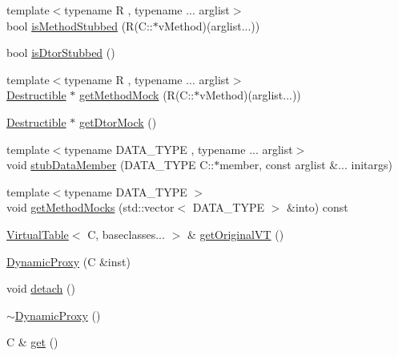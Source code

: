 \begin{DoxyCompactItemize}
\item 
{\footnotesize template$<$typename R , typename ... arglist$>$ }\\bool \mbox{\hyperlink{structfakeit_1_1DynamicProxy_aeccdd2a03ebbf8eecc3291ebe6ccbfc4}{is\+Method\+Stubbed}} (R(C\+::$\ast$v\+Method)(arglist...))
\item 
bool \mbox{\hyperlink{structfakeit_1_1DynamicProxy_a6d3f0dfa93dc98b37fb50002bc4ea2bc}{is\+Dtor\+Stubbed}} ()
\item 
{\footnotesize template$<$typename R , typename ... arglist$>$ }\\\mbox{\hyperlink{classfakeit_1_1Destructible}{Destructible}} $\ast$ \mbox{\hyperlink{structfakeit_1_1DynamicProxy_a9774578f92b4d0258c72192dd16d6d0e}{get\+Method\+Mock}} (R(C\+::$\ast$v\+Method)(arglist...))
\item 
\mbox{\hyperlink{classfakeit_1_1Destructible}{Destructible}} $\ast$ \mbox{\hyperlink{structfakeit_1_1DynamicProxy_a32f8a09734ef6d70162d682fd593707b}{get\+Dtor\+Mock}} ()
\item 
{\footnotesize template$<$typename D\+A\+T\+A\+\_\+\+T\+Y\+PE , typename ... arglist$>$ }\\void \mbox{\hyperlink{structfakeit_1_1DynamicProxy_a872480e95dba48c6e690fb7cdc017f9d}{stub\+Data\+Member}} (D\+A\+T\+A\+\_\+\+T\+Y\+PE C\+::$\ast$member, const arglist \&... initargs)
\item 
{\footnotesize template$<$typename D\+A\+T\+A\+\_\+\+T\+Y\+PE $>$ }\\void \mbox{\hyperlink{structfakeit_1_1DynamicProxy_a21e8fdd6bcf64b2d7e0b86261529da35}{get\+Method\+Mocks}} (std\+::vector$<$ D\+A\+T\+A\+\_\+\+T\+Y\+PE $>$ \&into) const
\item 
\mbox{\hyperlink{structfakeit_1_1VirtualTable}{Virtual\+Table}}$<$ C, baseclasses... $>$ \& \mbox{\hyperlink{structfakeit_1_1DynamicProxy_aa34a496518156007196fd405dbf2e058}{get\+Original\+VT}} ()
\item 
\mbox{\hyperlink{structfakeit_1_1DynamicProxy_a417e0221b7df3845b201a9e4a1f5028b}{Dynamic\+Proxy}} (C \&inst)
\item 
void \mbox{\hyperlink{structfakeit_1_1DynamicProxy_a154f25eeeb36c0635d9209dd5870943e}{detach}} ()
\item 
\mbox{\hyperlink{structfakeit_1_1DynamicProxy_a05e9d9c1bcaf4bcd14d1b6311e16c809}{$\sim$\+Dynamic\+Proxy}} ()
\item 
C \& \mbox{\hyperlink{structfakeit_1_1DynamicProxy_af8e4100c2d995a26bf3209e68c11d12a}{get}} ()
\item 

\end{DoxyCompactItemize}

